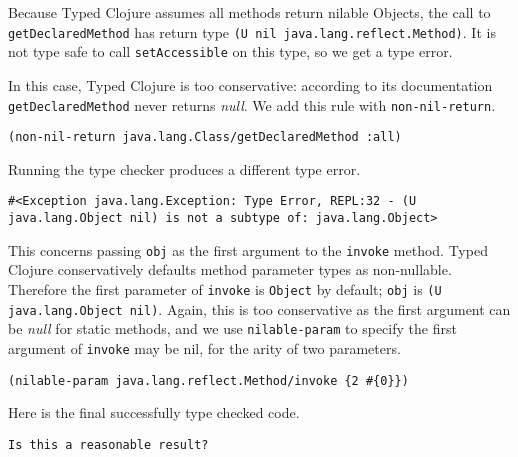 Because Typed Clojure assumes all methods return nilable Objects, the call to \lstinline|getDeclaredMethod|
has return type \lstinline|(U nil java.lang.reflect.Method)|. It is not type safe to call \lstinline|setAccessible|
on this type, so we get a type error.

In this case, Typed Clojure is too conservative: according to its documentation \lstinline|getDeclaredMethod|
never returns \emph{null}. We add this rule with \lstinline|non-nil-return|.

\begin{lstlisting}
(non-nil-return java.lang.Class/getDeclaredMethod :all)
\end{lstlisting}

Running the type checker produces a different type error.

\begin{lstlisting}
#<Exception java.lang.Exception: Type Error, REPL:32 - (U java.lang.Object nil) is not a subtype of: java.lang.Object>
\end{lstlisting}

This concerns passing \lstinline|obj| as the first argument to the \lstinline|invoke| method.
Typed Clojure conservatively defaults method parameter types as non-nullable. 
Therefore the first parameter of \lstinline|invoke| is \lstinline|Object| by default; \lstinline|obj|
is \lstinline|(U java.lang.Object nil)|. Again, this is too conservative as the first argument can
be \emph{null} for static methods, and we use \lstinline|nilable-param| to specify the first argument
of \lstinline|invoke| may be nil, for the arity of two parameters.

\begin{lstlisting}
(nilable-param java.lang.reflect.Method/invoke {2 #{0}})
\end{lstlisting}

Here is the final successfully type checked code.
\begin{verbatim}Is this a reasonable result?\end{verbatim}

